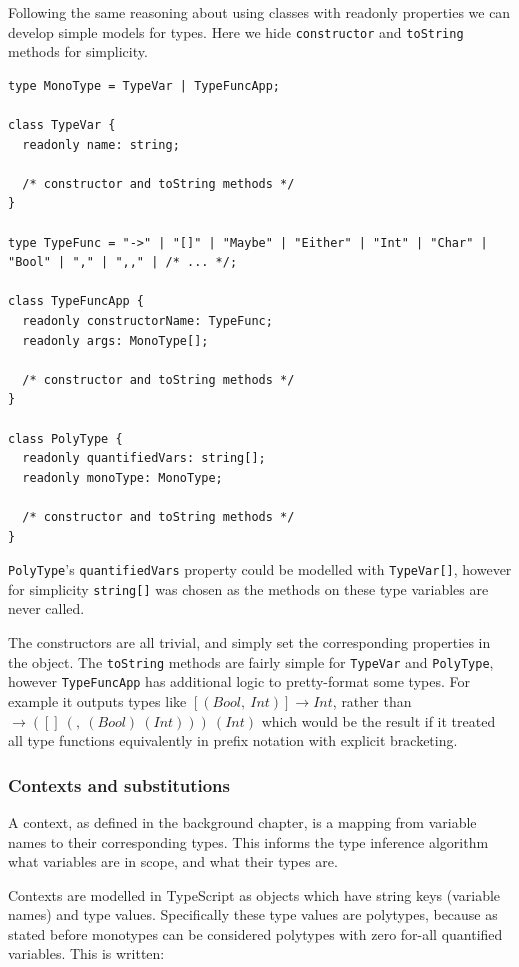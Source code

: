 \documentclass[a4paper,fleqn,oneside,12pt]{report}
\begin{document}
Following the same reasoning about using classes with readonly properties we can develop simple models for types. Here we hide \texttt{constructor} and \texttt{toString} methods for simplicity.

\begin{verbatim}
type MonoType = TypeVar | TypeFuncApp;

class TypeVar {
  readonly name: string;

  /* constructor and toString methods */
}

type TypeFunc = "->" | "[]" | "Maybe" | "Either" | "Int" | "Char" | "Bool" | "," | ",," | /* ... */;

class TypeFuncApp {
  readonly constructorName: TypeFunc;
  readonly args: MonoType[];

  /* constructor and toString methods */
}

class PolyType {
  readonly quantifiedVars: string[];
  readonly monoType: MonoType;

  /* constructor and toString methods */
}
\end{verbatim}
\texttt{PolyType}'s \texttt{quantifiedVars} property could be modelled with \texttt{TypeVar[]}, however for simplicity \texttt{string[]} was chosen as the methods on these type variables are never called.

The constructors are all trivial, and simply set the corresponding properties in the object. The \texttt{toString} methods are fairly simple for \texttt{TypeVar} and \texttt{PolyType}, however \texttt{TypeFuncApp} has additional logic to pretty-format some types. For example it outputs types like $[(Bool,\ Int)] \rightarrow Int$, rather than $\rightarrow ([]\ (,\ (Bool)\ (Int)))\ (Int)$ which would be the result if it treated all type functions equivalently in prefix notation with explicit bracketing.

\subsubsection{Contexts and substitutions}\label{id:h.ux3btyb2wvh8}

A context, as defined in the background chapter, is a mapping from variable names to their corresponding types. This informs the type inference algorithm what variables are in scope, and what their types are.

Contexts are modelled in TypeScript as objects which have string keys (variable names) and type values. Specifically these type values are polytypes, because as stated before monotypes can be considered polytypes with zero for-all quantified variables. This is written:
\end{document}
